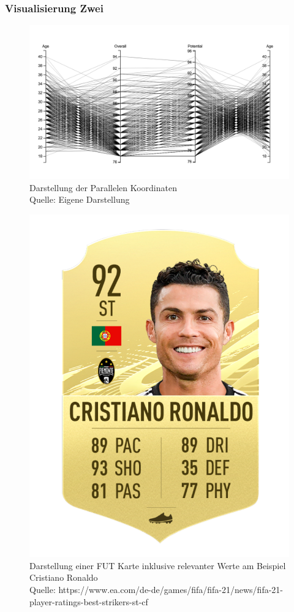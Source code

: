 \documentclass[usegeometry=true]{scrartcl}
\begin{document}
\subsubsection{Visualisierung Zwei}

\begin{figure}[h]
\centering
\includegraphics[scale=0.4]{grafiken/ParalleleKoordinaten1}
\caption{Darstellung der Parallelen Koordinaten\\ Quelle: Eigene Darstellung}
\end{figure}



\begin{figure}[h]
\includegraphics[scale=0.2]{grafiken/Ronaldo}
\caption{Darstellung einer FUT Karte inklusive relevanter Werte am Beispiel Cristiano Ronaldo\\ Quelle: https://www.ea.com/de-de/games/fifa/fifa-21/news/fifa-21-player-ratings-best-strikers-st-cf}
\end{figure}
\end{document}
